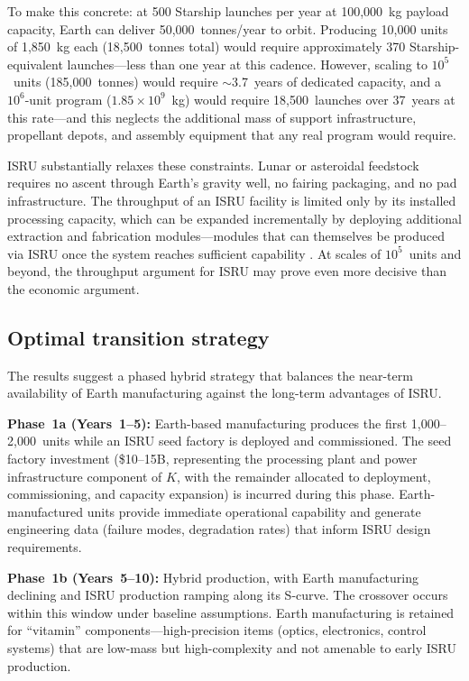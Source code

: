 \documentclass[preprint,12pt]{elsarticle}
\begin{document}
To make this concrete: at 500 Starship launches per year at 100{,}000~kg payload capacity, Earth can deliver 50{,}000~tonnes/year to orbit. Producing 10{,}000 units of 1{,}850~kg each (18{,}500~tonnes total) would require approximately 370 Starship-equivalent launches---less than one year at this cadence. However, scaling to $10^5$~units (185{,}000~tonnes) would require $\sim$3.7~years of dedicated capacity, and a $10^6$-unit program ($1.85 \times 10^9$~kg) would require 18{,}500~launches over 37~years at this rate---and this neglects the additional mass of support infrastructure, propellant depots, and assembly equipment that any real program would require.

ISRU substantially relaxes these constraints. Lunar or asteroidal feedstock requires no ascent through Earth's gravity well, no fairing packaging, and no pad infrastructure. The throughput of an ISRU facility is limited only by its installed processing capacity, which can be expanded incrementally by deploying additional extraction and fabrication modules---modules that can themselves be produced via ISRU once the system reaches sufficient capability \cite{metzger2013}. At scales of $10^5$~units and beyond, the throughput argument for ISRU may prove even more decisive than the economic argument.

\subsection{Optimal transition strategy}

The results suggest a phased hybrid strategy that balances the near-term availability of Earth manufacturing against the long-term advantages of ISRU.

\textbf{Phase~1a (Years~1--5):} Earth-based manufacturing produces the first 1{,}000--2{,}000~units while an ISRU seed factory is deployed and commissioned. The seed factory investment (\$10--15B, representing the processing plant and power infrastructure component of $K$, with the remainder allocated to deployment, commissioning, and capacity expansion) is incurred during this phase. Earth-manufactured units provide immediate operational capability and generate engineering data (failure modes, degradation rates) that inform ISRU design requirements.

\textbf{Phase~1b (Years~5--10):} Hybrid production, with Earth manufacturing declining and ISRU production ramping along its S-curve. The crossover occurs within this window under baseline assumptions. Earth manufacturing is retained for ``vitamin'' components---high-precision items (optics, electronics, control systems) that are low-mass but high-complexity and not amenable to early ISRU production.
\end{document}

